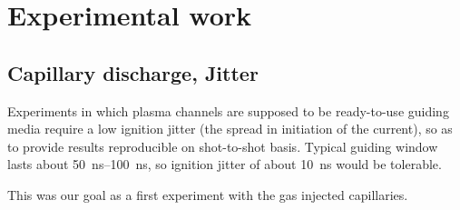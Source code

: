 \documentclass[justified,nofonts,nobib,openany]{tufte-book}
\begin{document}
\chapter{Experimental work}\label{chap:Experimental_work}
\section{Capillary discharge, Jitter}\label{sec:jitter}
Experiments in which plasma channels are supposed to be ready-to-use guiding media require a low ignition jitter (the spread in initiation of the current), so as to provide results reproducible on shot-to-shot basis. Typical guiding window lasts about \SIrange{50}{100}{\ns}, so ignition jitter of about \SI{10}{ns} would be tolerable.

This was our goal as a first experiment with the gas injected capillaries.
\end{document}
